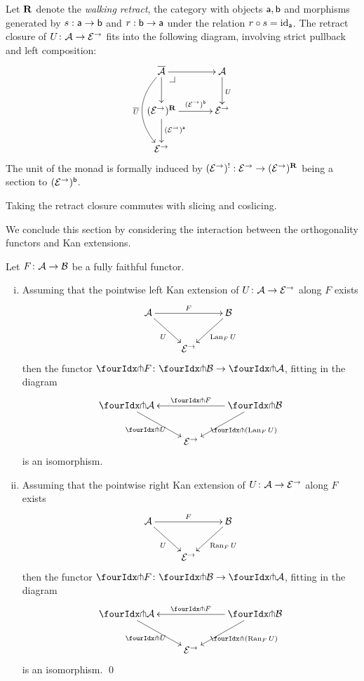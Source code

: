 \documentclass[reqno,10pt,a4paper,oneside]{amsart}
\begin{document}
\begin{remark} Let $\mathbf{R}$ denote the \emph{walking retract}, \ie the category with objects $\mathsf{a}, \mathsf{b}$ and morphisms generated by $s : \mathsf{a} \to \mathsf{b}$ and $r : \mathsf{b} \to \mathsf{a}$ under the relation $r \mathbin{\circ} s = \operatorname{id}_{\mathsf{a}}$. The retract closure of $U \colon \mathcal{A} \to \mathcal{E}^\to$ fits into the following diagram, involving strict pullback and left composition:
\[
\xymatrix@C+1em{
  \overline{\cal{A}}
  \ar[r]
  \ar[d]
  \ar@/_2em/[dd]_{\overline{U}}
  \pullback{dr}
&
  \cal{A}
  \ar[d]^{U}
\\
  (\catE^{\to})^{\ret}
  \ar[r]^-{(\catE^{\to})^{\retB}}
  \ar[d]^{(\catE^{\to})^{\retA}}
&
  \catE^{\to}
\\
  \catE^{\to}
}
\]
The unit of the monad is formally induced by $(\mathcal{E}^{\to})^{\mathord{!}} : \mathcal{E}^{\to} \to (\mathcal{E}^{\to})^{\mathbf{R}}$ being a section to $(\mathcal{E}^{\to})^{\mathsf{b}}$.
\end{remark}


\begin{remark}
\label{retract-closure-slicing}
Taking the retract closure commutes with slicing and coslicing.
\end{remark}

\medskip

We conclude this section by considering the interaction between the orthogonality functors and  Kan extensions.




\begin{proposition} Let $F \colon \mathcal{A} \to \mathcal{B}$ be a fully faithful functor. 
\label{kan-extension-closure}
\begin{enumerate}[(i)]
\item Assuming that the pointwise left Kan extension of 
$U \colon \mathcal{A} \to \mathcal{E}^{\to}$ along $F$ exists
\[
\xymatrix{
  \cal{A}
  \ar[dr]_{U}
  \ar[rr]^{F}
&&
  \cal{B}
  \ar[dl]^{\Lan_F U}
\\&
  \catE^{\to}
}
\]
then the functor $\liftr{F} \co \liftr{\cal{B}} \to \liftr{\cal{A}}$,  fitting in the diagram
\[
\xymatrix{
  \liftr{\cal{A}}
  \ar[dr]_{\liftr{U}}
&&
  \liftr{\cal{B}}
  \ar[ll]_{\liftr{F}}
  \ar[dl]^{\liftr{(\Lan_F U)}}
\\&
  \catE^{\to}
}
\]
is an isomorphism.
\item Assuming that the pointwise right Kan extension of 
$U \colon \mathcal{A} \to \mathcal{E}^{\to}$ along $F$ exists
\[
\xymatrix{
  \cal{A}
  \ar[dr]_{U}
  \ar[rr]^{F}
&&
  \cal{B}
  \ar[dl]^{\Ran_F U}
\\&
  \catE^{\to}
}
\]
then the functor $\liftl{F} \co \liftl{\cal{B}} \to \liftl{\cal{A}}$, fitting in the diagram
\[
\xymatrix{
  \liftl{\cal{A}}
  \ar[dr]_{\liftl{U}}
&&
  \liftl{\cal{B}}
  \ar[ll]_{\liftl{F}}
  \ar[dl]^{\liftl{(\Ran_F U)}}
\\&
  \catE^{\to}
}
\]
is an isomorphism. \qed
\end{enumerate}
\end{proposition}
\end{document}
